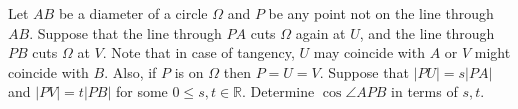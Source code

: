 Let $AB$ be a diameter of a circle $\Omega$ and $P$ be any point not on the line through $AB$. Suppose that the line through $PA$ cuts $\Omega$ again at $U$,  and the line through $PB$ cuts $\Omega$ at $V$. Note that in case of tangency, $U$ may coincide with $A$ or $V$ might coincide with $B$. Also, if $P$ is on $\Omega$ then $P=U=V$. Suppose that $|PU|=s|PA|$ and $|PV|=t|PB|$ for some $0\le s,t\in \mathbb{R}$. Determine $\cos \angle APB$ in terms of $s,t$.